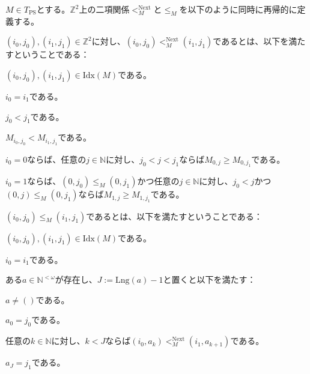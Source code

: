 \documentclass[dvipdfmx,uplatex]{jsarticle}
\theoremstyle{customnonumberbreakfortheorem}
\theoremstyle{customnonumberbreakforproof}
\begin{document}
\(M \in T_{\textrm{PS}}\)とする。\(\mathbb{Z}^2\)上の二項関係\(<_M^{\textrm{Next}}\)と\(\leq_M\)を以下のように同時に再帰的に定義する。
\begin{nenumerate}
	\item \((i_0,j_0), (i_1,j_1) \in \mathbb{Z}^2\)に対し、\((i_0,j_0)  <_M^{\textrm{Next}} (i_1,j_1)\)であるとは、以下を満たすということである：
	\begin{nenumerate}
		\item \((i_0,j_0),(i_1,j_1) \in \textrm{Idx}(M)\)である。
		\item \(i_0 = i_1\)である。
		\item \(j_0 < j_1\)である。
		\item \(M_{i_0,j_0} < M_{i_1,j_1}\)である。
		\item \(i_0 = 0\)ならば、任意の\(j \in \mathbb{N}\)に対し、\(j_0 < j < j_1\)ならば\(M_{0,j} \geq M_{0,j_1}\)である。
		\item \(i_0 = 1\)ならば、\((0,j_0) \leq_M (0,j_1)\)かつ任意の\(j \in \mathbb{N}\)に対し、\(j_0 < j\)かつ\((0,j) \leq_M (0,j_1)\)ならば\(M_{1,j} \geq M_{1,j_1}\)である。
	\end{nenumerate}
	\item \((i_0,j_0) \leq_M (i_1,j_1)\)であるとは、以下を満たすということである：
	\begin{nenumerate}
		\item \((i_0,j_0),(i_1,j_1) \in \textrm{Idx}(M)\)である。
		\item \(i_0 = i_1\)である。
		\item ある\(a \in \mathbb{N}^{< \omega}\)が存在し、\(J := \textrm{Lng}(a) - 1\)と置くと以下を満たす：
		\begin{nenumerate}
			\item \(a \neq ()\)である。
			\item \(a_0 = j_0\)である。
			\item 任意の\(k \in \mathbb{N}\)に対し、\(k < J\)ならば\((i_0,a_k) <_M^{\textrm{Next}}(i_1,a_{k+1})\)である。
			\item \(a_J = j_1\)である。
		\end{nenumerate}
	\end{nenumerate}
\end{nenumerate}
\end{document}
